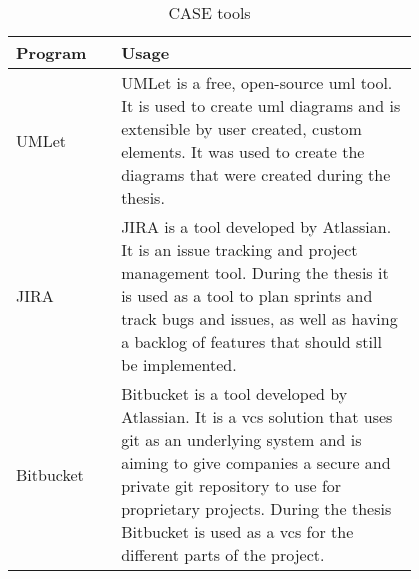 \begin{table}[htbp]
	\begin{center}
	\begin{tabular}{|p{0.2\linewidth}|p{0.6\linewidth}|} \hline
	\textbf{Program} & \textbf{Usage} \\ \hline
	UMLet & UMLet is a free, open-source \gls{uml} tool. It is used to create \gls{uml} diagrams and is extensible by user created, custom elements. \citep{website:umlet} It was used to create the diagrams that were created during the thesis.  \\ \hline
	JIRA & JIRA is a tool developed by Atlassian. It is an issue tracking and project management tool. During the thesis it is used as a tool to plan sprints and track bugs and issues, as well as having a backlog of features that should still be implemented. \\ \hline
	Bitbucket & Bitbucket is a tool developed by Atlassian. It is a \gls{vcs} solution that uses git as an underlying system and is aiming to give companies a secure and private git repository to use for proprietary projects. During the thesis Bitbucket is used as a \gls{vcs} for the different parts of the project. \\ \hline
	\end{tabular}
	\end{center}
	\caption{CASE tools}\label{tab:case}
\end{table}